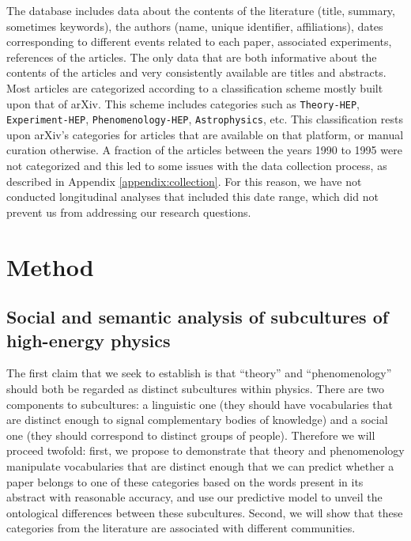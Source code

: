 \documentclass[smallextended]{svjour3}
\begin{document}
The database includes data about the contents of the literature (title, summary, sometimes keywords), the authors (name, unique identifier, affiliations), dates corresponding to different events related to each paper, associated experiments, references of the articles. The only data that are both informative about the contents of the articles and very consistently available are titles and abstracts. Most articles are categorized according to a classification scheme mostly built upon that of arXiv. This scheme includes categories such as \texttt{Theory-HEP}, \texttt{Experiment-HEP}, \texttt{Phenomenology-HEP}, \texttt{Astrophysics}, etc. This classification rests upon arXiv's categories for articles that are available on that platform, or manual curation otherwise. A fraction of the articles between the years 1990 to 1995 were not categorized and this led to some issues with the data collection process, as described in Appendix \ref{appendix:collection}. For this reason, we have not conducted longitudinal analyses that included this date range, which did not prevent us from addressing our research questions.

\section{Method}\label{section:method}

\subsection{Social and semantic analysis of subcultures of high-energy physics}\label{section:method_subcultures}

The first claim that we seek to establish is that ``theory'' and ``phenomenology'' should both be regarded as distinct subcultures within physics. There are two components to subcultures: a linguistic one (they should have vocabularies that are distinct enough to signal complementary bodies of knowledge) and a social one (they should correspond to distinct groups of people). Therefore we will proceed twofold: first, we propose to demonstrate that theory and phenomenology manipulate vocabularies that are distinct enough that we can predict whether a paper belongs to one of these categories based on the words present in its abstract with reasonable accuracy, and use our predictive model to unveil the ontological differences between these subcultures. Second, we will show that these categories from the literature are associated with different communities.
\end{document}
